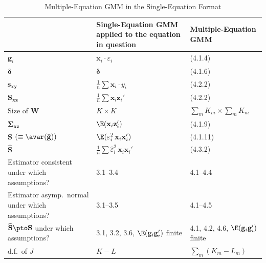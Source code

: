 \begin{table}[htbp]
\centering
\caption{Multiple-Equation GMM in the Single-Equation Format}
\label{tab:4.1}
\small
\medskip
\begin{tabular}{@{}p{3.8cm}p{3.5cm}p{3.5cm}@{}}
\toprule
& Single-Equation GMM applied to the equation in question
& Multiple-Equation GMM \\
\midrule
$\mathbf{g}_i$ & $\mathbf{x}_i \cdot \varepsilon_i$ & (4.1.4) \\[3pt]
$\boldsymbol{\delta}$ & $\boldsymbol{\delta}$ & (4.1.6) \\[3pt]
$\mathbf{s}_{\mathbf{xy}}$
& $\frac{1}{n}\sum \mathbf{x}_i \cdot y_i$ & (4.2.2) \\[3pt]
$\mathbf{S}_{\mathbf{xz}}$
& $\frac{1}{n}\sum \mathbf{x}_i \mathbf{z}_i'$ & (4.2.2) \\[3pt]
Size of $\mathbf{W}$ & $K \times K$
& $\sum_m K_m \times \sum_m K_m$ \\[3pt]
$\boldsymbol{\Sigma}_{\mathbf{xz}}$
& $\E(\mathbf{x}_i \mathbf{z}_i')$ & (4.1.9) \\[3pt]
$\mathbf{S}$ $(\equiv \avar(\bar{\mathbf{g}}))$
& $\E(\varepsilon_i^2\, \mathbf{x}_i \mathbf{x}_i')$ & (4.1.11) \\[3pt]
$\widehat{\mathbf{S}}$
& $\frac{1}{n}\sum \hat{\varepsilon}_i^2\, \mathbf{x}_i \mathbf{x}_i'$
& (4.3.2) \\[3pt]
\midrule
Estimator consistent under which assumptions?
& 3.1--3.4 & 4.1--4.4 \\[3pt]
Estimator asymp.\ normal under which assumptions?
& 3.1--3.5 & 4.1--4.5 \\[3pt]
$\widehat{\mathbf{S}} \pto \mathbf{S}$ under which assumptions?
& 3.1, 3.2, 3.6, $\E(\mathbf{g}_i \mathbf{g}_i')$ finite
& 4.1, 4.2, 4.6, $\E(\mathbf{g}_i \mathbf{g}_i')$ finite \\[3pt]
d.f.\ of $J$ & $K - L$ & $\sum_m(K_m - L_m)$ \\
\bottomrule
\end{tabular}
\end{table}
